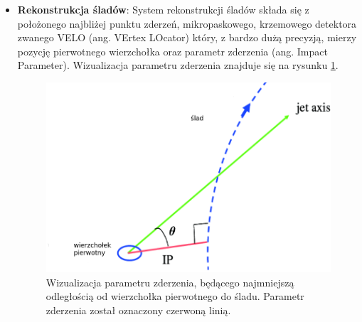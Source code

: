 \begin{itemize}
\item \textbf{Rekonstrukcja śladów}: System rekonstrukcji śladów składa się z położonego najbliżej punktu zderzeń, mikropaskowego, krzemowego detektora zwanego VELO (ang. VErtex LOcator) który, z  bardzo dużą precyzją,   mierzy pozycję pierwotnego wierzchołka oraz parametr zderzenia (ang. Impact Parameter). Wizualizacja parametru zderzenia znajduje się na rysunku \ref{fig:IP}.
\begin{figure}[th] 
  \centering
  \includegraphics[scale=0.5]{rozdzial2/impactParameter.png}
  \caption{Wizualizacja parametru zderzenia, będącego najmniejszą odległością od wierzchołka pierwotnego do śladu. Parametr zderzenia został oznaczony czerwoną linią. }
  \label{fig:IP}
\end{figure}


\end{itemize}
